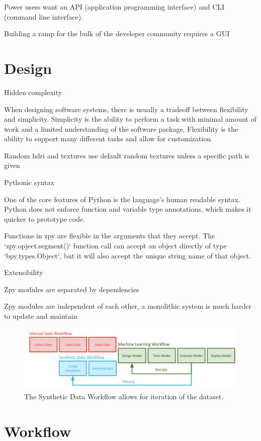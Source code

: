 \documentclass{article}
\begin{document}
Power users want an API (application programming interface) and CLI (command line interface).

Building a ramp for the bulk of the developer community requires a GUI

\section{Design}
\label{sec:design}

Hidden complexity

When designing software systems, there is usually a tradeoff between flexibility and simplicity. Simplicity is the ability to perform a task with minimal amount of work and a limited understanding of the software package. Flexibility is the ability to support many different tasks and allow for customization.

Random hdri and textures use default random textures unless a specific path is given

Pythonic syntax

One of the core features of Python is the language’s human readable syntax. Python does not enforce function and variable type annotations, which makes it quicker to prototype code.

Functions in zpy are flexible in the arguments that they accept. The `zpy.opject.segment()` function call can accept an object directly of type `bpy.types.Object`, but it will also accept the unique string name of that object. 

Extensibility

Zpy modules are separated by dependencies

Zpy modules are independent of each other, a monolithic system is much harder to update and maintain


\begin{figure}
	\centering
	\includegraphics[width=\textwidth]{workflow.png}
	\caption{The Synthetic Data Workflow allows for iteration of the dataset.}
	\label{fig:fig3}
\end{figure}

\section{Workflow}
\label{sec:workflow}
\end{document}
